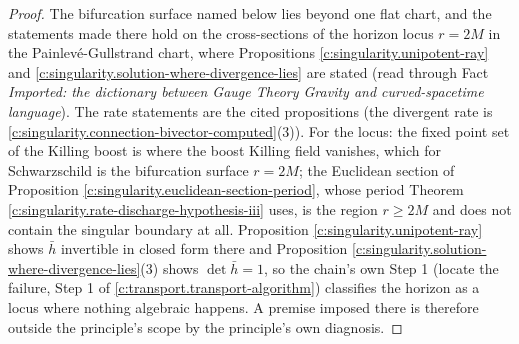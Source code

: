 \documentclass[11pt]{article}
\theoremstyle{definition}
\theoremstyle{plain}
\providecommand{\hb}{}\renewcommand{\hb}{\bar{h}}
\begin{document}
\begin{proof}
The bifurcation surface named below lies beyond one flat chart, and the statements made there hold on the cross-sections of the horizon locus $r = 2M$ in the Painlev\'e-Gullstrand chart, where Propositions \ref{c:singularity.unipotent-ray} and \ref{c:singularity.solution-where-divergence-lies} are stated (read through Fact \emph{Imported: the dictionary between Gauge Theory Gravity and curved-spacetime language}). The rate statements are the cited propositions (the divergent rate is \ref{c:singularity.connection-bivector-computed}(3)). For the locus: the fixed point set of the Killing boost is where the boost Killing field vanishes, which for Schwarzschild is the bifurcation surface $r = 2M$; the Euclidean section of Proposition \ref{c:singularity.euclidean-section-period}, whose period Theorem \ref{c:singularity.rate-discharge-hypothesis-iii} uses, is the region $r \geq 2M$ and does not contain the singular boundary at all. Proposition \ref{c:singularity.unipotent-ray} shows $\hb$ invertible in closed form there and Proposition \ref{c:singularity.solution-where-divergence-lies}(3) shows $\det\hb = 1$, so the chain's own Step 1 (locate the failure, Step 1 of \ref{c:transport.transport-algorithm}) classifies the horizon as a locus where nothing algebraic happens. A premise imposed there is therefore outside the principle's scope by the principle's own diagnosis.

\end{proof}
\end{document}
